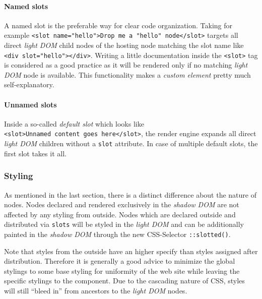 \documentclass[]{article}
\let\oldparagraph\paragraph
\renewcommand{\paragraph}[1]{\oldparagraph{#1}\mbox{}}
\begin{document}
\paragraph{Named slots}\label{named-slots}

A named slot is the preferable way for clear code organization. Taking
for example
\texttt{\textless{}slot\ name="hello"\textgreater{}Drop\ me\ a\ "hello"\ node\textless{}/slot\textgreater{}}
targets all direct \emph{light DOM} child nodes of the hosting node
matching the slot name like
\texttt{\textless{}div\ slot="hello"\textgreater{}\textless{}/div\textgreater{}}.
Writing a little documentation inside the
\texttt{\textless{}slot\textgreater{}} tag is considered as a good
practice as it will be rendered only if no matching \emph{light DOM}
node is available. This functionality makes a \emph{custom element}
pretty much self-explanatory.

\paragraph{Unnamed slots}\label{unnamed-slots}

Inside a so-called \emph{default slot} which looks like
\texttt{\textless{}slot\textgreater{}Unnamed\ content\ goes\ here\textless{}/slot\textgreater{}},
the render engine expands all direct \emph{light DOM} children without a
\texttt{slot} attribute. In case of multiple default slots, the first
slot takes it all.

\subsubsection{Styling}\label{styling}

As mentioned in the last section, there is a distinct difference about
the nature of nodes. Nodes declared and rendered exclusively in the
\emph{shadow DOM} are not affected by any styling from outside. Nodes
which are declared outside and distributed via \texttt{slots} will be
styled in the \emph{light DOM} and can be additionally painted in the
\emph{shadow DOM} through the new CSS-Selector \texttt{::slotted()}.

Note that styles from the outside have an higher specify than styles
assigned after distribution. Therefore it is generally a good advice to
minimize the global stylings to some base styling for uniformity of the
web site while leaving the specific stylings to the component. Due to
the cascading nature of CSS, styles will still ``bleed in'' from
ancestors to the \emph{light DOM} nodes.
\end{document}
